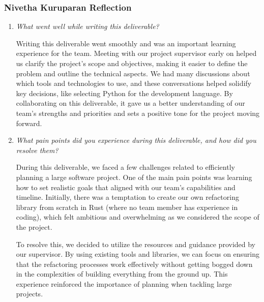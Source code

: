 \documentclass{article}
\begin{document}
\subsubsection*{Nivetha Kuruparan Reflection}
\begin{enumerate}
  \item \textit{What went well while writing this deliverable?}

    Writing this deliverable went smoothly and was an important learning experience for the team.
    Meeting with our project supervisor early on helped us clarify the project’s scope and objectives,
    making it easier to define the problem and outline the technical aspects. We had many discussions
    about which tools and technologies to use, and these conversations helped solidify key decisions,
    like selecting Python for the development language. By collaborating on this deliverable, it gave
    us a better understanding of our team's strengths and priorities and sets a positive tone for the
    project moving forward.

  \item \textit{What pain points did you experience during this deliverable, and how did you resolve them?}

    During this deliverable, we faced a few challenges related to efficiently planning a large software
    project. One of the main pain points was learning how to set realistic goals that aligned with our
    team's capabilities and timeline. Initially, there was a temptation to create our own refactoring
    library from scratch in Rust (where no team member has experience in coding), which felt ambitious
    and overwhelming as we considered the scope of the project.

    To resolve this, we decided to utilize the resources and guidance provided by our supervisor. By using
    existing tools and libraries, we can focus on ensuring that the refactoring processes work effectively
    without getting bogged down in the complexities of building everything from the ground up. This
    experience reinforced the importance of planning when tackling large projects.

\end{enumerate}
\end{document}
